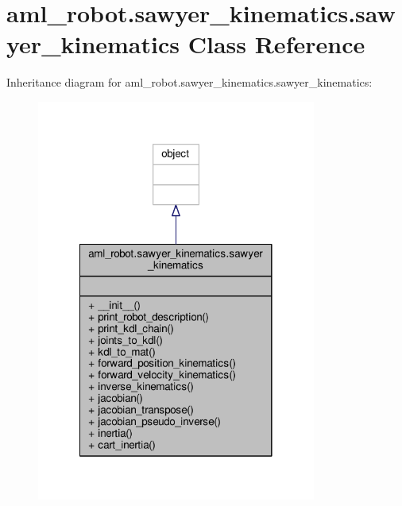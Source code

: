 \hypertarget{classaml__robot_1_1sawyer__kinematics_1_1sawyer__kinematics}{\section{aml\-\_\-robot.\-sawyer\-\_\-kinematics.\-sawyer\-\_\-kinematics Class Reference}
\label{classaml__robot_1_1sawyer__kinematics_1_1sawyer__kinematics}
}


Inheritance diagram for aml\-\_\-robot.\-sawyer\-\_\-kinematics.\-sawyer\-\_\-kinematics\-:
\nopagebreak
\begin{figure}[H]
\begin{center}
\leavevmode
\includegraphics[width=260pt]{classaml__robot_1_1sawyer__kinematics_1_1sawyer__kinematics__inherit__graph}
\end{center}
\end{figure}


